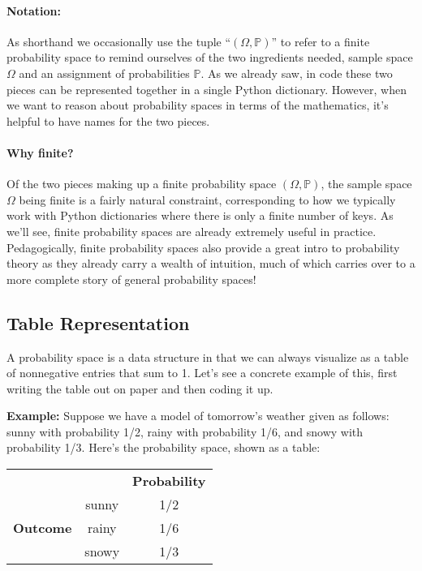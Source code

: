 \documentclass[6008notes.tex]{subfiles}
\begin{document}
 
\paragraph{Notation:} As shorthand we occasionally use the tuple ``$(\Omega ,\mathbb {P})$'' to refer to a finite probability space to remind ourselves of the two ingredients needed, sample space $\Omega$ and an assignment of probabilities $\mathbb {P}$. As we already saw, in code these two pieces can be represented together in a single Python dictionary. However, when we want to reason about probability spaces in terms of the mathematics, it's helpful to have names for the two pieces.

\paragraph{Why finite?} Of the two pieces making up a finite probability space $(\Omega ,\mathbb {P})$, the sample space $\Omega$ being finite is a fairly natural constraint, corresponding to how we typically work with Python dictionaries where there is only a finite number of keys. As we'll see, finite probability spaces are already extremely useful in practice. Pedagogically, finite probability spaces also provide a great intro to probability theory as they already carry a wealth of intuition, much of which carries over to a more complete story of general probability spaces!

\subsection{Table Representation}

A probability space is a data structure in that we can always visualize as a table of nonnegative entries that sum to 1. Let's see a concrete example of this, first writing the table out on paper and then coding it up.

\textbf{Example:} Suppose we have a model of tomorrow's weather given as follows: sunny with probability 1/2, rainy with probability 1/6, and snowy with probability 1/3. Here's the probability space, shown as a table:

\begin{center}
\begin{tabular}{c c c}
 & & \textbf{Probability} \\
 &	sunny	& 1/2 \\
\textbf{Outcome} &	rainy &	1/6 \\
 &	snowy	& 1/3
\end{tabular}
\end{center}
\end{document}
